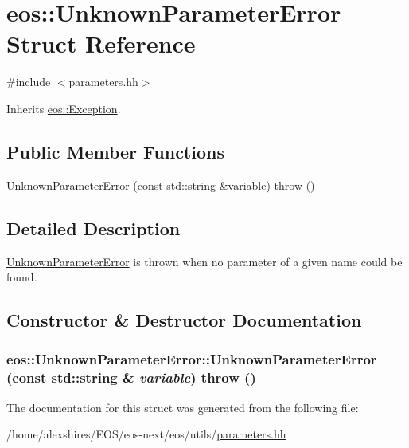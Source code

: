 \hypertarget{structeos_1_1UnknownParameterError}{
\section{eos::UnknownParameterError Struct Reference}
\label{structeos_1_1UnknownParameterError}
}


{\ttfamily \#include $<$parameters.hh$>$}

Inherits \hyperlink{classeos_1_1Exception}{eos::Exception}.\subsection*{Public Member Functions}
\begin{DoxyCompactItemize}
\item 
\hyperlink{structeos_1_1UnknownParameterError_a9c475df66b9e6316e6a1a2a93c86e4a3}{UnknownParameterError} (const std::string \&variable)  throw ()
\end{DoxyCompactItemize}


\subsection{Detailed Description}
\hyperlink{structeos_1_1UnknownParameterError}{UnknownParameterError} is thrown when no parameter of a given name could be found. 

\subsection{Constructor \& Destructor Documentation}
\hypertarget{structeos_1_1UnknownParameterError_a9c475df66b9e6316e6a1a2a93c86e4a3}{
\subsubsection[{UnknownParameterError}]{\setlength{\rightskip}{0pt plus 5cm}eos::UnknownParameterError::UnknownParameterError (const std::string \& {\em variable})  throw ()}}
\label{structeos_1_1UnknownParameterError_a9c475df66b9e6316e6a1a2a93c86e4a3}


The documentation for this struct was generated from the following file:\begin{DoxyCompactItemize}
\item 
/home/alexshires/EOS/eos-\/next/eos/utils/\hyperlink{parameters_8hh}{parameters.hh}\end{DoxyCompactItemize}
